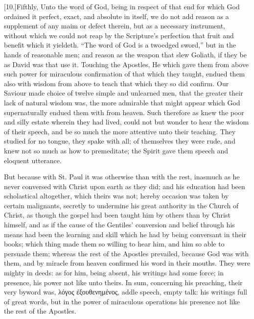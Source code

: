 [10.]Fifthly, Unto the word of God, being in respect of that end for which God ordained it perfect, exact, and absolute in itself, we do not add reason as a supplement of any maim or defect therein, but as a necessary instrument, without which we could not reap by the Scripture’s perfection that fruit and benefit which it yieldeth. “The word of God is a twoedged sword,” but in the hands of reasonable men; and reason as the weapon that slew Goliath, if they be as David was that use it. Touching the Apostles, He which gave them from above such power for miraculous confirmation of that which they taught, endued them also with wisdom from above to teach that which they so did confirm. Our Saviour made choice of twelve simple and unlearned men, that the greater their lack of natural wisdom was, the more admirable that might appear which God supernaturally endued them with from heaven. Such therefore as knew the poor and silly estate wherein they had lived, could not but wonder to hear the wisdom of their speech, and be so much the more attentive unto their teaching. They studied for no tongue, they spake with all; of themselves they were rude, and knew not so much as how to premeditate; the Spirit gave them speech and eloquent utterance.

But because with St. Paul it was otherwise than with the  rest, inasmuch as he never conversed with Christ upon earth as they did; and his education had been scholastical altogether, which theirs was not; hereby occasion was taken by certain malignants, secretly to undermine his great authority in the Church of Christ, as though the gospel had been taught him by others than by Christ himself, and as if the cause of the Gentiles’ conversion and belief through his means had been the learning and skill which he had by being conversant in their books; which thing made them so willing to hear him, and him so able to persuade them; whereas the rest of the Apostles prevailed, because God was with them, and by miracle from heaven confirmed his word in their mouths. They were mighty in deeds: as for him, being absent, his writings had some force; in presence, his power not like unto theirs. In sum, concerning his preaching, their very byword was, λόγος ἐξουθενημένος, addle speech, empty talk: his writings full of great words, but in the power of miraculous operations his presence not like the rest of the Apostles.

